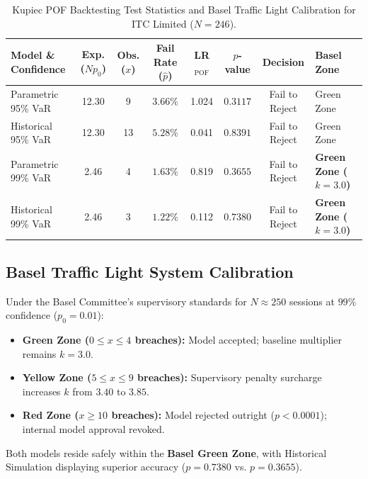 \begin{table}[!htbp]
    \centering
    \footnotesize
    \setlength{\tabcolsep}{4.5pt}
    \caption{Kupiec POF Backtesting Test Statistics and Basel Traffic Light Calibration for ITC Limited ($N = 246$).}
    \label{tab:kupiec_backtesting}
    \vspace{0.2em}
    \renewcommand{\arraystretch}{1.18}
    \begin{tabularx}{\textwidth}{l c c c c c c >{\raggedright\arraybackslash}X}
        \toprule
        \textbf{Model \& Confidence} & \textbf{Exp. ($N p_0$)} & \textbf{Obs. ($x$)} & \textbf{Fail Rate ($\hat{p}$)} & \textbf{LR$_{\text{POF}}$} & \textbf{$p$-value} & \textbf{Decision} & \textbf{Basel Zone} \\
        \midrule
        Parametric 95\% VaR & 12.30 & 9 & $3.66\%$ & 1.024 & $0.3117$ & Fail to Reject & Green Zone \\
        Historical 95\% VaR & 12.30 & 13 & $5.28\%$ & 0.041 & $0.8391$ & Fail to Reject & Green Zone \\
        Parametric 99\% VaR & 2.46 & 4 & $1.63\%$ & 0.819 & $0.3655$ & Fail to Reject & \textbf{Green Zone ($k=3.0$)} \\
        Historical 99\% VaR & 2.46 & 3 & $1.22\%$ & 0.112 & $0.7380$ & Fail to Reject & \textbf{Green Zone ($k=3.0$)} \\
        \bottomrule
    \end{tabularx}
\end{table}

\subsection{Basel Traffic Light System Calibration}

Under the Basel Committee's supervisory standards for $N \approx 250$ sessions at $99\%$ confidence ($p_0 = 0.01$):
\begin{itemize}[leftmargin=1.5em, itemsep=1pt, parsep=0pt]
    \item \textbf{Green Zone ($0 \le x \le 4$ breaches):} Model accepted; baseline multiplier remains $k = 3.0$.
    \item \textbf{Yellow Zone ($5 \le x \le 9$ breaches):} Supervisory penalty surcharge increases $k$ from $3.40$ to $3.85$.
    \item \textbf{Red Zone ($x \ge 10$ breaches):} Model rejected outright ($p < 0.0001$); internal model approval revoked.
\end{itemize}
Both models reside safely within the \textbf{Basel Green Zone}, with Historical Simulation displaying superior accuracy ($p = 0.7380$ vs. $p = 0.3655$).

\clearpage
